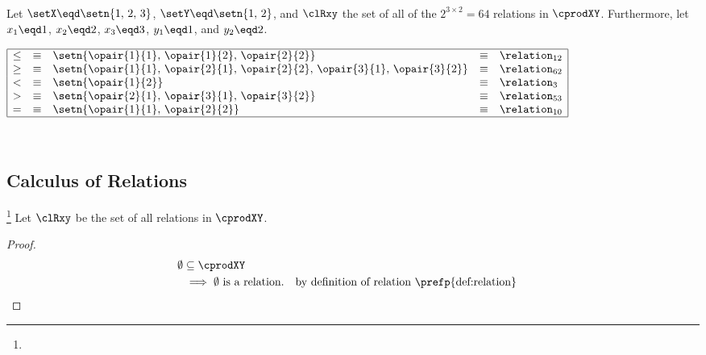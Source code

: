 \begin{example}
\label{ex:rel_123_12_common}
\hspace{1pt}\\
  Let $\setX\eqd\setn{1,\,2,\,3}$, $\setY\eqd\setn{1,\,2}$, 
  and $\clRxy$ the set of all of the $2^{3\times2}=64$ relations in $\cprodXY$.
  Furthermore, let $x_1\eqd1$, $x_2\eqd2$, $x_3\eqd3$, $y_1\eqd1$, and $y_2\eqd2$.
\begin{minipage}{10\tw/16-3mm}%
  $\begin{array}{|cclcl|}
    \hline
    \leq &\equiv& \setn{\opair{1}{1},\,\opair{1}{2},\,\opair{2}{2}}   &\equiv& \relation_{12} \\
    \geq &\equiv& \setn{\opair{1}{1},\,\opair{2}{1},\,\opair{2}{2},\, \opair{3}{1},\,\opair{3}{2}}   &\equiv& \relation_{62} \\
    <    &\equiv& \setn{\opair{1}{2}}   &\equiv& \relation_{3} \\
    >    &\equiv& \setn{\opair{2}{1},\, \opair{3}{1},\,\opair{3}{2}}   &\equiv& \relation_{53} \\
    =    &\equiv& \setn{\opair{1}{1},\, \opair{2}{2}}   &\equiv& \relation_{10}\\
    \hline
  \end{array}$
\end{minipage}%
\hfill{}\hfill\mbox{}\\%
\end{example}

\subsection{Calculus of Relations}
\begin{proposition}
\footnote{
  }
\label{prop:rel_emptyset}
Let $\clRxy$ be the set of all relations in $\cprodXY$.
\end{proposition}
\begin{proof}
\begin{align*}
  \emptyset
    &\subseteq \cprodXY
  \\&\implies \text{$\emptyset$ is a relation.}
    && \text{by definition of relation \prefp{def:relation}}
\end{align*}
\end{proof}

